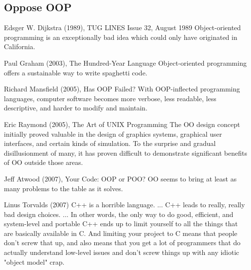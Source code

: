 \documentclass[12pt]{KodeBookAr}
\begin{document}
\subsection{Oppose OOP}

\begin{kodequote}{Edsger W. Dijkstra (1989), TUG LINES Issue 32, August 1989}
	Object-oriented programming is an exceptionally bad idea which could only have originated in California.
\end{kodequote}


\begin{kodequote}{Paul Graham (2003), The Hundred-Year Language}
	Object-oriented programming offers a sustainable way to write spaghetti code.
\end{kodequote}

\begin{kodequote}{Richard Mansfield (2005), Has OOP Failed?}
	With OOP-inflected programming languages, computer software becomes more verbose, less readable, less descriptive, and harder to modify and maintain.
\end{kodequote}

\begin{kodequote}{Eric Raymond (2005), The Art of UNIX Programming}
	The OO design concept initially proved valuable in the design of graphics systems, graphical user interfaces, and certain kinds of simulation. To the surprise and gradual disillusionment of many, it has proven difficult to demonstrate significant benefits of OO outside those areas.
\end{kodequote}

\begin{kodequote}{Jeff Atwood (2007), Your Code: OOP or POO?}
	OO seems to bring at least as many problems to the table as it solves.
\end{kodequote}


\begin{kodequote}{Linus Torvalds (2007)}
	C++ is a horrible language. ... C++ leads to really, really bad design choices. ... In other words, the only way to do good, efficient, and system-level and portable C++ ends up to limit yourself to all the things that are basically available in C. And limiting your project to C means that people don't screw that up, and also means that you get a lot of programmers that do actually understand low-level issues and don't screw things up with any idiotic "object model" crap.
\end{kodequote}
\end{document}
